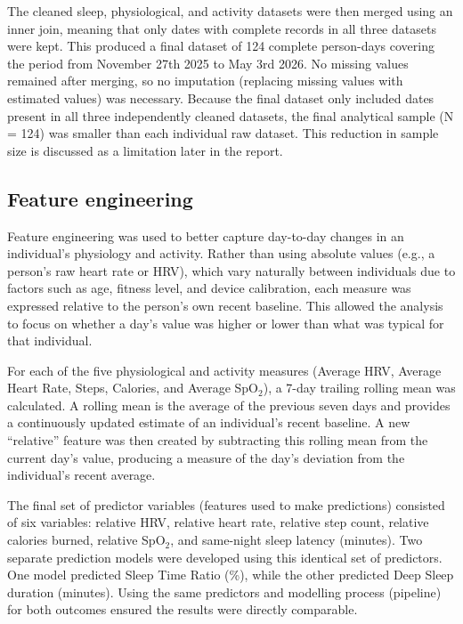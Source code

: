 \documentclass[fleqn,10pt]{wlscirep}
\begin{document}
The cleaned sleep, physiological, and activity datasets were then merged using an inner join, meaning that only dates with complete records in all three datasets were kept. This produced a final dataset of 124 complete person-days covering the period from November 27th 2025 to May 3rd 2026. No missing values remained after merging, so no imputation (replacing missing values with estimated values) was necessary. Because the final dataset only included dates present in all three independently cleaned datasets, the final analytical sample (N = 124) was smaller than each individual raw dataset. This reduction in sample size is discussed as a limitation later in the report.

\subsection*{Feature engineering}

Feature engineering was used to better capture day-to-day changes in an individual's physiology and activity. Rather than using absolute values (e.g., a person's raw heart rate or HRV), which vary naturally between individuals due to factors such as age, fitness level, and device calibration, each measure was expressed relative to the person's own recent baseline. This allowed the analysis to focus on whether a day's value was higher or lower than what was typical for that individual.

For each of the five physiological and activity measures (Average HRV, Average Heart Rate, Steps, Calories, and Average SpO$_2$), a 7-day trailing rolling mean was calculated. A rolling mean is the average of the previous seven days and provides a continuously updated estimate of an individual's recent baseline. A new ``relative'' feature was then created by subtracting this rolling mean from the current day's value, producing a measure of the day's deviation from the individual's recent average.

The final set of predictor variables (features used to make predictions) consisted of six variables: relative HRV, relative heart rate, relative step count, relative calories burned, relative SpO$_2$, and same-night sleep latency (minutes). Two separate prediction models were developed using this identical set of predictors. One model predicted Sleep Time Ratio (\%), while the other predicted Deep Sleep duration (minutes). Using the same predictors and modelling process (pipeline) for both outcomes ensured the results were directly comparable.
\end{document}
